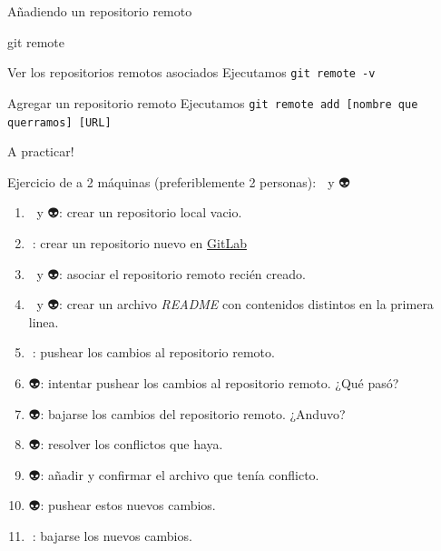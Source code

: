 \begin{frame}[t]{Añadiendo un repositorio remoto}
    \begin{comando}
        git remote
    \end{comando}

    \vspace{0.5em}
    \pause
    \begin{block}{Ver los repositorios remotos asociados}
        Ejecutamos \texttt{git remote -v}
    \end{block}

    \pause
    \begin{block}{Agregar un repositorio remoto}
        Ejecutamos \texttt{git remote add [nombre que querramos] [URL]}
    \end{block}
\end{frame}

\begin{frame}[t]{A practicar!}

    \begin{ejercicio}{Ejercicio de a 2 máquinas (preferiblemente 2 personas): 👾 y 👽}
        \begin{enumerate}
            \pause
            \item 👾 y 👽: crear un repositorio local vacio.
            \pause
            \item 👾: crear un repositorio nuevo en \href{https://www.gitlab.com}{GitLab}
            \pause
            \item 👾 y 👽: asociar el repositorio remoto recién creado.
            \pause
            \item 👾 y 👽: crear un archivo \textit{README} con contenidos distintos en la primera linea.
            \pause
            \item 👾: pushear los cambios al repositorio remoto.
            \pause
            \item 👽: intentar pushear los cambios al repositorio remoto. ¿Qué pasó?
            \pause
            \item 👽: bajarse los cambios del repositorio remoto. ¿Anduvo?
            \pause
            \item 👽: resolver los conflictos que haya.
            \pause
            \item 👽: añadir y confirmar el archivo que tenía conflicto.
            \pause
            \item 👽: pushear estos nuevos cambios.
            \pause
            \item 👾: bajarse los nuevos cambios.
        \end{enumerate}
    \end{ejercicio}

\end{frame}
